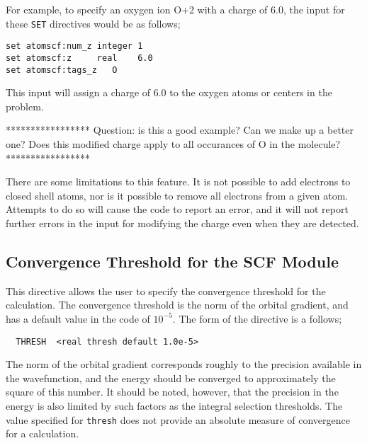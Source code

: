 For example, to specify an oxygen ion O+2 with a charge of 6.0, the input
for these \verb+SET+ directives would be as follows;

\begin{verbatim}
set atomscf:num_z integer 1
set atomscf:z     real    6.0
set atomscf:tags_z   O
\end{verbatim}

This input will assign a charge of 6.0 to the oxygen atoms or centers
in the problem.

\Large
*****************
Question: is this a good example?
Can we make up a better one?
Does this modified charge apply to all occurances of O in the molecule?
*****************
\normalsize




There are some limitations to this feature.  It is not possible to add
electrons to closed shell atoms, nor is it possible to remove all electrons
from a given atom.  Attempts to do so will cause the code to report an error,
and it will not report further errors in the input for modifying the charge 
even when they are detected.

\subsection{Convergence Threshold for the SCF Module}
\label{sec:thresh}


This directive allows the user to specify the convergence threshold for the
calculation.  The convergence threshold is the norm of the orbital gradient,
and has a default value in the code of $10^{-5}$.  The form of the directive
is a follows;

\begin{verbatim}
  THRESH  <real thresh default 1.0e-5>
\end{verbatim}

The norm of the orbital gradient corresponds
roughly to the precision available in the wavefunction, and the energy
should be converged to approximately the square of this number.  It should
be noted, however, that
the precision in the energy is also limited by such factors as 
the integral selection thresholds.  The value specified for \verb+thresh+
does not provide an absolute measure of convergence for a calculation. 

